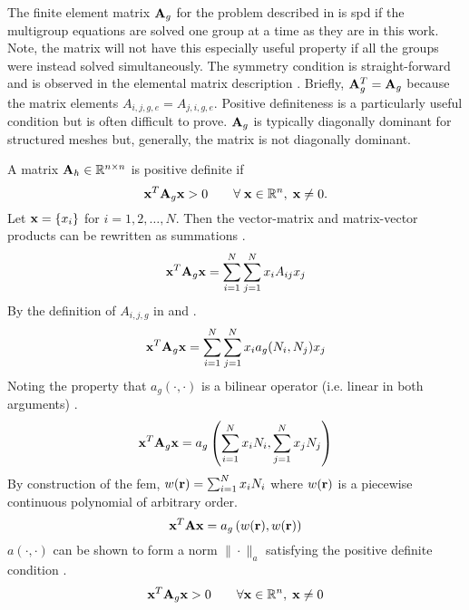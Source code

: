     The finite element matrix $\mathbf{A}_g$ for the problem described in
     is \gls{spd} if the multigroup equations are
    solved one group at a time as they are in this work. Note, the matrix will 
    not have this especially useful property if all the groups were instead
    solved simultaneously. The symmetry condition is straight-forward and is
    observed in the elemental matrix description .
    Briefly, $\mathbf{A}_g^T = \mathbf{A}_g$ because the matrix elements 
    ${A_{i,j,g,e}=A_{j,i,g,e}}$.
    Positive definiteness is a particularly useful condition but is often
    difficult to prove. 
    $\mathbf{A}_g$ is typically diagonally dominant for structured meshes 
    but, generally, the matrix is not diagonally dominant. 
    
    A matrix $\mathbf{A}_h \in \mathbb{R}^{n \times n}$ is positive definite if
    \begin{equation} \label{eq:positive_definite}
      \mathbf{x}^{T} \mathbf{A}_g \mathbf{x} > 0 \qquad \forall \; \mathbf{x} \in \mathbb{R}^{n}, \; \mathbf{x} \ne 0.
    \end{equation}
    Let $\mathbf{x} = \{x_i\}$ for $i = 1,2,\ldots,N$. Then the vector-matrix and 
    matrix-vector products can be rewritten as summations \cite{textbookhughes}.
    \begin{equation}
      \mathbf{x}^{T} \mathbf{A}_g \mathbf{x} = \sum_{i=1}^{N} \sum_{j=1}^{N} x_i A_{ij} x_j
    \end{equation}
    By the definition of $A_{i,j,g}$ in  and 
    .
    \begin{equation}
      \mathbf{x}^{T} \mathbf{A}_g \mathbf{x} = 
        \sum_{i=1}^{N} \sum_{j=1}^{N} x_i a_g(N_i,N_j) x_j
    \end{equation}
    Noting the property that $a_g(\cdot,\cdot)$ is a bilinear operator (i.e.
    linear in both arguments) \cite{textbookli}.
    \begin{equation}
      \mathbf{x}^{T} \mathbf{A}_g \mathbf{x} =
        a_g \left( \sum_{i=1}^{N} x_i N_i, \sum_{j=1}^{N} x_j N_j 
        \right)
    \end{equation}
    By construction of the \gls{fem}, $w(\mathbf{r}) = \sum_{i=1}^{N} x_i N_i$ 
    where $w(\mathbf{r})$ is a piecewise continuous polynomial of arbitrary order.
    \begin{equation}
      \mathbf{x}^{T} \mathbf{A} \mathbf{x} = a_g \left(w(\mathbf{r}),w(\mathbf{r})\right)
    \end{equation}
    $a(\cdot,\cdot)$ can be shown to form a norm $\|\cdot \|_a$
    \cite{textbookli} satisfying the positive definite condition
    .
    \begin{equation}
      \mathbf{x}^{T} \mathbf{A}_g \mathbf{x} > 0 \qquad \forall \mathbf{x} \in \mathbb{R}^{n}, \; \mathbf{x} \ne 0
    \end{equation}
    
